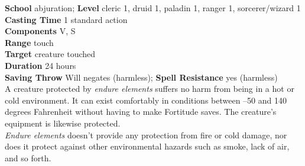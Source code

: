\textbf{School} abjuration; \textbf{Level} cleric 1, druid 1, paladin 1, ranger 1, sorcerer/wizard 1\\
\textbf{Casting Time} 1 standard action\\
\textbf{Components} V, S\\
\textbf{Range} touch\\
\textbf{Target} creature touched\\
\textbf{Duration} 24 hours\\
\textbf{Saving Throw }Will negates (harmless); \textbf{Spell Resistance} yes (harmless)\\
A creature protected by \textit{endure elements }suffers no harm from being in a hot or cold environment. It can exist comfortably in conditions between –50 and 140 degrees Fahrenheit without having to make Fortitude saves. The creature's equipment is likewise protected.\\
\textit{Endure elements }doesn't provide any protection from fire or cold damage, nor does it protect against other environmental hazards such as smoke, lack of air, and so forth.\\
